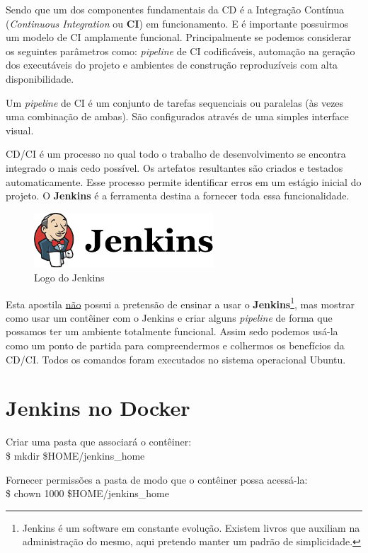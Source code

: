 \documentclass[a4paper,11pt]{article}
\begin{document}
Sendo que um dos componentes fundamentais da CD é a Integração Contínua (\textit{Continuous Integration} ou \textbf{CI}) em funcionamento. E é importante possuirmos um modelo de CI amplamente funcional. Principalmente se podemos considerar os seguintes parâmetros como: \textit{pipeline} de CI codificáveis, automação na geração dos executáveis do projeto e ambientes de construção reproduzíveis com alta disponibilidade.

Um \textit{pipeline} de CI é um conjunto de tarefas sequenciais ou paralelas (às vezes uma combinação de ambas). São configurados através de uma simples interface visual.

CD/CI é um processo no qual todo o trabalho de desenvolvimento se encontra integrado o mais cedo possível. Os artefatos resultantes são criados e testados automaticamente. Esse processo permite identificar erros em um estágio inicial do projeto. O \textbf{Jenkins}\cite{jenkins} é a ferramenta destina a fornecer toda essa funcionalidade.

\begin{figure}[!htb]
	\centering
	\includegraphics[width=0.6\textwidth]{imagens/logo.png}
	\caption{Logo do Jenkins}
\end{figure}

Esta apostila \underline{não} possui a pretensão de ensinar a usar o \textbf{Jenkins}\footnote{Jenkins é um software em constante evolução. Existem livros que auxiliam na administração do mesmo, aqui pretendo manter um padrão de simplicidade.}, mas mostrar como usar um contêiner com o Jenkins e criar alguns \textit{pipeline} de forma que possamos ter um ambiente totalmente funcional. Assim sedo podemos usá-la como um ponto de partida para compreendermos e colhermos os benefícios da CD/CI. Todos os comandos foram executados no sistema operacional Ubuntu.

\section{Jenkins no Docker}
Criar uma pasta que associará o contêiner: \\
{\ttfamily\$ mkdir \$HOME/jenkins\_home}

Fornecer permissões a pasta de modo que o contêiner possa acessá-la: \\
{\ttfamily\$ chown 1000 \$HOME/jenkins\_home}
\end{document}
